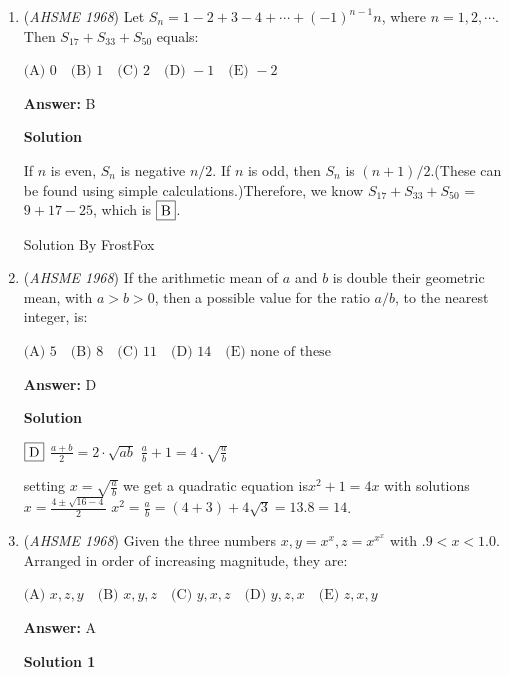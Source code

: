 \begin{enumerate}
Note that $S = 2(1+2+3+...+N) = N(N +1)$. It follows that $N = 1000$, so the sum of the digits of $N$ is $\fbox{E}$. 

 
FrostFox

 


	\item (\textit{AHSME 1968}) Let $S_n=1-2+3-4+\cdots +(-1)^{n-1}n$, where $n=1,2,\cdots$. Then $S_{17}+S_{33}+S_{50}$ equals:


 $\text{(A) } 0\quad \text{(B) } 1\quad \text{(C) } 2\quad \text{(D) } -1\quad \text{(E) } -2$

 \textbf{Answer: }B



\textbf{Solution}

If $n$ is even, $S_{n}$ is negative $n/2$. If $n$ is odd, then $S_{n}$ is $(n+1)/2$.(These can be found using simple calculations.)Therefore, we know $S_{17}+S_{33}+S_{50}$ =$9+17-25$, which is $\fbox{B}$.

 
Solution By FrostFox

 


	\item (\textit{AHSME 1968}) If the arithmetic mean of $a$ and $b$ is double their geometric mean, with $a>b>0$, then a possible value for the ratio $a/b$, to the nearest integer, is:


 $\text{(A) } 5\quad \text{(B) } 8\quad \text{(C) } 11\quad \text{(D) } 14\quad \text{(E) none of these}$

 \textbf{Answer: }D



\textbf{Solution}

$\fbox{D}$
$\frac{a+b}{2}=2\cdot\sqrt{ab}$
$\frac{a}{b} +1=4\cdot\sqrt{\frac{a}{b}}$

 setting $x=\sqrt{\frac{a}{b}}$ we get a quadratic equation is$x^2+1=4x$ with solutions $x=\frac{4\pm \sqrt{16-4}}{2}$
$x^2=\frac{a}{b}=(4+3)+4\sqrt{3}=13.8=14$.

 


	\item (\textit{AHSME 1968}) Given the three numbers $x,y=x^x,z=x^{x^x}$ with $.9<x<1.0$. Arranged in order of increasing magnitude, they are:


 $\text{(A) } x,z,y\quad \text{(B) } x,y,z\quad \text{(C) } y,x,z\quad \text{(D) } y,z,x\quad \text{(E) } z,x,y$

 \textbf{Answer: }A



\textbf{Solution 1}


\end{enumerate}
